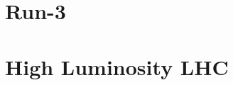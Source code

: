 \label{sec:Outlook}

\section{Run-3}
\label{sec:Run3}


\section{High Luminosity LHC}
\label{sec:HLLHC}

